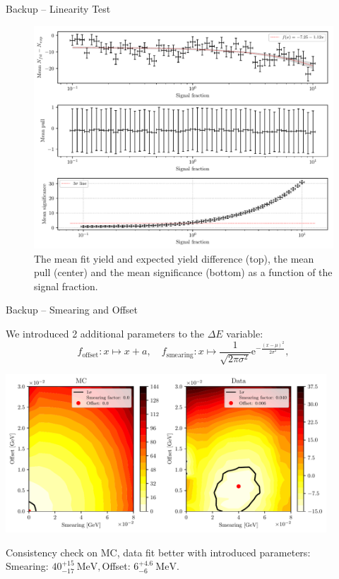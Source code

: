 \documentclass[serif]{beamer}
\newcommand {\e}[1]{\mathrm{~#1}}
\newcommand{\backupend}{
	\setcounter{framenumber}{\value{finalframe}}
}
\begin{document}
\begin{frame}[t]{Backup -- Linearity Test}
\vspace{-3mm}
\small
\begin{figure}[H]
	\centering
	\includegraphics[width=0.7\linewidth]{fig/lin_test}
	\caption{The mean fit yield and expected yield difference (top), the mean pull (center) and the mean significance (bottom) as a function of the signal fraction.}
\end{figure}
\end{frame}


\begin{frame}[t]{Backup -- Smearing and Offset}
\vspace{-3mm}
\small

We introduced 2 additional parameters to the $\Delta E$ variable:
$$
f_{\mathrm{offset}}: x \mapsto x + a, \quad
f_{\mathrm{smearing}}: x \mapsto \frac{1}{\sqrt{2\pi \sigma^2}} \mathrm{e}^{-\frac{(x-\mu)^2}{2\sigma^2}},
$$
\vspace{-5mm}
\begin{center}
	\includegraphics[width=0.9\textwidth]{fig/smearing_offset}
\end{center}
\vspace{-3.5mm}
Consistency check on MC, data fit better with introduced parameters:\\
Smearing: $40_{-17}^{+15}\e{MeV},$\quad Offset: $6_{-6}^{+4.6}\e{MeV}$.

\end{frame}


\begin{frame}[t]
\small 
\printbibliography

\end{frame}


\backupend
\end{document}
